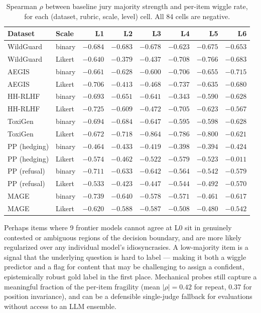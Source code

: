\begin{table}[t]
\centering
\small
\caption{Spearman $\rho$ between baseline jury majority strength and per-item wiggle rate, for each (dataset, rubric, scale, level) cell. All 84 cells are negative.}
\label{tab:jury-rho}
\begin{tabular}{@{}llrrrrrr@{}}
\toprule
\textbf{Dataset} & \textbf{Scale} & \textbf{L1} & \textbf{L2} & \textbf{L3} & \textbf{L4} & \textbf{L5} & \textbf{L6} \\
\midrule
WildGuard      & binary & $-0.684$ & $-0.683$ & $-0.678$ & $-0.623$ & $-0.675$ & $-0.653$ \\
WildGuard      & Likert & $-0.640$ & $-0.379$ & $-0.437$ & $-0.708$ & $-0.766$ & $-0.683$ \\
AEGIS          & binary & $-0.661$ & $-0.628$ & $-0.600$ & $-0.706$ & $-0.655$ & $-0.715$ \\
AEGIS          & Likert & $-0.706$ & $-0.413$ & $-0.468$ & $-0.737$ & $-0.635$ & $-0.680$ \\
HH-RLHF        & binary & $-0.693$ & $-0.651$ & $-0.641$ & $-0.343$ & $-0.590$ & $-0.628$ \\
HH-RLHF        & Likert & $-0.725$ & $-0.609$ & $-0.472$ & $-0.705$ & $-0.623$ & $-0.567$ \\
ToxiGen        & binary & $-0.694$ & $-0.684$ & $-0.647$ & $-0.595$ & $-0.598$ & $-0.628$ \\
ToxiGen        & Likert & $-0.672$ & $-0.718$ & $-0.864$ & $-0.786$ & $-0.800$ & $-0.621$ \\
PP (hedging)   & binary & $-0.464$ & $-0.433$ & $-0.419$ & $-0.398$ & $-0.394$ & $-0.424$ \\
PP (hedging)   & Likert & $-0.574$ & $-0.462$ & $-0.522$ & $-0.579$ & $-0.523$ & $-0.011$ \\
PP (refusal)   & binary & $-0.711$ & $-0.633$ & $-0.642$ & $-0.564$ & $-0.542$ & $-0.579$ \\
PP (refusal)   & Likert & $-0.533$ & $-0.423$ & $-0.447$ & $-0.544$ & $-0.492$ & $-0.570$ \\
MAGE           & binary & $-0.739$ & $-0.640$ & $-0.578$ & $-0.571$ & $-0.461$ & $-0.617$ \\
MAGE           & Likert & $-0.620$ & $-0.588$ & $-0.587$ & $-0.508$ & $-0.480$ & $-0.542$ \\
\bottomrule
\end{tabular}
\end{table}

Perhaps items where 9 frontier models cannot agree at L0 sit in genuinely contested or ambiguous regions of the decision boundary, and are more likely regularized
over any individual model's idiosyncrasies. A low-majority item is a signal that the underlying question is hard to label 
--- making it both a wiggle predictor and a flag for content that may be challenging to assign a confident, epistemically robust gold label in the first place.
Mechanical probes still capture a meaningful fraction of the per-item fragility (mean $|\rho| = 0.42$ for repeat, 
0.37 for position invariance), and can be a defensible single-judge fallback for evaluations without access to an LLM ensemble.

